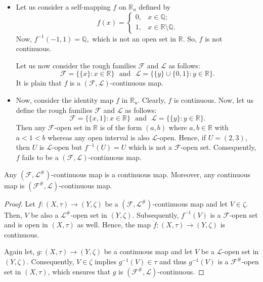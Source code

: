 \documentclass[11pt]{amsart}
\begin{document}
\begin{example}
\begin{itemize}
    \item[(i)]  Let us consider a self-mapping $f$ on $\mathbb{R}_u$ defined by $$f(x)=\begin{cases}
        0, &x\in\mathbb{Q};\\
        1, &x\in \mathbb{R}\setminus\mathbb{Q}.
    \end{cases}$$
Now, $f^{-1}(-1,1)=\mathbb{Q},$ which is not an open set in $\mathbb{R}$. So, $f$ is not continuous. 

Let us now consider the rough families $\mathscr{F}$ and $\mathscr{L}$ as follows:
$$\mathscr{F}=\{\{x\}:x\in \mathbb{R}\}~~~\text{and}~~~\mathscr{L}=\{\{y\}\cup\{0,1\}: y\in \mathbb{R}\}.$$
It is plain that $f$ is a $(\mathscr{F},\mathscr{L})$-continuous map. 

\item[(ii)] Now, consider the identity map $f$ in $\mathbb{R}_u$. Clearly, $f$ is continuous. Now, let us define the rough families $\mathscr{F}$ and $\mathscr{L}$ as follows:
$$\mathscr{F}=\{\{x,1\}:x\in \mathbb{R}\}~~~\text{and}~~~\mathscr{L}=\{\{y\}: y\in \mathbb{R}\}.$$
Then any $\mathscr{F}$-open set in $\mathbb{R}$ is of the form $(a,b)$ where $a,b\in \mathbb{R}$ with $a<1<b$ whereas any open interval is also $\mathscr{L}$-open. Hence, if $U=(2,3)$, then $U$ is $\mathscr{L}$-open but $f^{-1}(U)=U$ which is not a $\mathscr{F}$-open set. Consequently, $f$ fails to be a $(\mathscr{F},\mathscr{L})$-continuous map.
\end{itemize}
\end{example}
 
 


\begin{theorem} Any $(\mathscr{F},\mathscr{L}^\#)$-continuous map is a continuous map. Moreover, any continuous map is $(\mathscr{F^\#},\mathscr{L})$-continuous map. 
\end{theorem}

\begin{proof}
    Let $f: (X,\tau)\to(Y,\zeta)$ be a $(\mathscr{F},\mathscr{L}^\#)$-continuous map and let 
    $V\in \zeta$. Then, $V$ be also a $\mathscr{L}^\#$-open set in $(Y,\zeta)$. Subsequently, $f^{-1}(V)$ is a $\mathscr{F}$-open set and is open in $(X,\tau)$ as well. Hence, the map $f: (X,\tau)\to(Y,\zeta)$ is continuous.

    Again let, $g: (X,\tau)\to(Y,\zeta)$ be a continuous map and let $V$ be a $\mathscr{L}$-open set in $(Y,\zeta)$. Consequently, $V\in \zeta$ implies $g^{-1}(V)\in \tau$ and thus $g^{-1}(V)$ is a $\mathscr{F}^\#$-open set in $(X,\tau)$, which ensures that $g$ is $(\mathscr{F^\#},\mathscr{L})$-continuous.
\end{proof}
\end{document}
